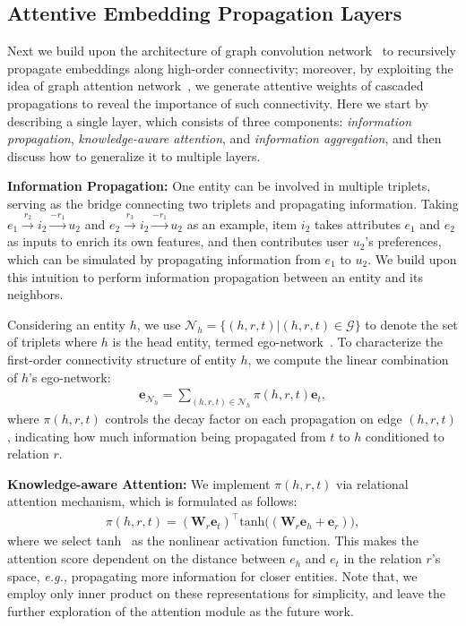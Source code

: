 \documentclass[sigconf]{acmart}
\newcommand{\Trans}[1]{{#1}^{\top}}
\newcommand{\Mat}[1]{\mathbf{#1}}
\newcommand{\Set}[1]{\mathcal{#1}}
\newcommand{\eg}{\emph{e.g., }}
\theoremstyle{definition}
\begin{document}
\subsection{Attentive Embedding Propagation Layers}
Next we build upon the architecture of graph convolution network~\cite{GCN} to recursively propagate embeddings along high-order connectivity;
moreover, by exploiting the idea of graph attention network~\cite{GAT}, we generate attentive weights of cascaded propagations to reveal the importance of such connectivity.
Here we start by describing a single layer, which consists of three components: \emph{information propagation}, \emph{knowledge-aware attention}, and \emph{information aggregation}, and then discuss how to generalize it to multiple layers.


\vspace{5px}
\noindent\textbf{Information Propagation:}
One entity can be involved in multiple triplets, serving as the bridge connecting two triplets and propagating information.
Taking $e_1\xrightarrow{r_2} i_{2}\xrightarrow{-r_1} u_2$ and $e_2\xrightarrow{r_3} i_{2}\xrightarrow{-r_1} u_2$ as an example, item $i_2$ takes attributes $e_1$ and $e_2$ as inputs to enrich its own features, and then contributes user $u_2$'s preferences, which can be simulated by propagating information from $e_1$ to $u_2$.
We build upon this intuition to perform information propagation between an entity and its neighbors.



Considering an entity $h$, we use $\Set{N}_{h}=\{(h,r,t)|(h,r,t)\in\Set{G}\}$ to denote the set of triplets where $h$ is the head entity, termed ego-network~\cite{DeepInf}.
To characterize the first-order connectivity structure of entity $h$, we compute the linear combination of $h$'s ego-network:
\begin{align}
    \Mat{e}_{\Set{N}_{h}}=\sum_{(h,r,t)\in\Set{N}_{h}}\pi(h,r,t)\Mat{e}_{t},
\end{align}
where $\pi(h,r,t)$ controls the decay factor on each propagation on edge $(h,r,t)$, indicating how much information being propagated from $t$ to $h$ conditioned to relation $r$.






\vspace{5px}
\noindent\textbf{Knowledge-aware Attention:}
We implement $\pi(h,r,t)$ via relational attention mechanism, which is formulated as follows:
\begin{align}\label{equ:attention}
    \pi(h,r,t)=\Trans{(\Mat{W}_{r}\Mat{e}_{t})}\text{tanh}\Big((\Mat{W}_{r}\Mat{e}_{h}+\Mat{e}_{r})\Big),
\end{align}
where we select tanh~\cite{GAT} as the nonlinear activation function.
This makes the attention score dependent on the distance between $e_h$ and $e_t$ in the relation $r$'s space, \eg propagating more information for closer entities.
Note that, we employ only inner product on these representations for simplicity, and leave the further exploration of the attention module as the future work.
\end{document}
